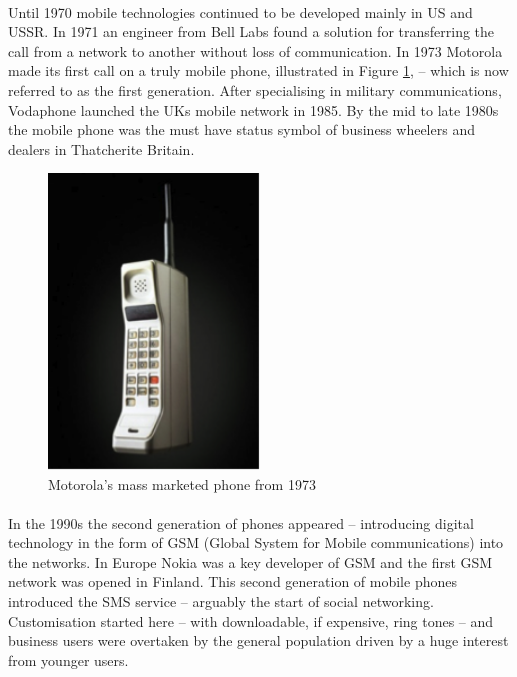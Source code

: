 \paragraph{} Until 1970 mobile technologies continued to be developed mainly in US and USSR. In 1971 an engineer from Bell Labs found a solution for transferring the call from a network to another without loss of communication. In 1973 Motorola made its first call on a truly mobile phone, illustrated in Figure \ref{fig:brick-phone}, – which is now referred to as the first generation. After specialising in military communications, Vodaphone launched the UKs mobile network in 1985. By the mid to late 1980s the mobile phone was the must have status symbol of business wheelers and dealers in Thatcherite Britain.

\begin{figure}[htb]
\centering
\includegraphics[width=0.5\textwidth]{images/brick-phone}
\caption{Motorola's mass marketed phone from 1973}
\label{fig:brick-phone}
\end{figure}

\paragraph{} In the 1990s the second generation of phones appeared – introducing digital technology in the form of GSM (Global System for Mobile communications) into the networks. In Europe Nokia was a key developer of GSM and the first GSM network was opened in Finland. This second generation of mobile phones introduced the SMS service – arguably the start of social networking. Customisation started here – with downloadable, if expensive, ring tones – and business users were overtaken by the general population driven by a huge interest from younger users.

